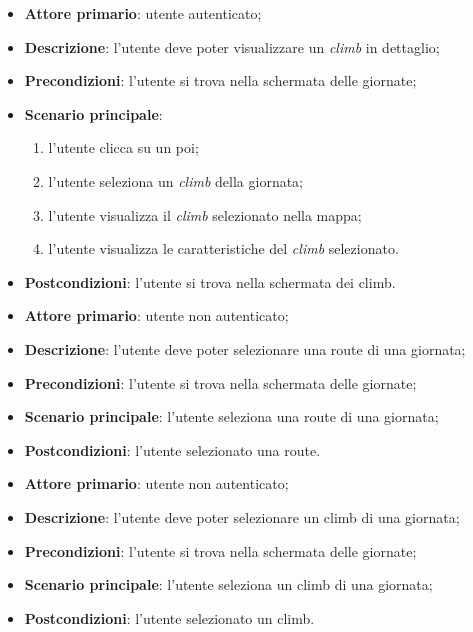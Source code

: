 \label{uc:vis_climb}
\begin{itemize}
	\item \textbf{Attore primario}: utente autenticato;
	\item \textbf{Descrizione}: l'utente deve poter visualizzare un \textit{climb} in dettaglio;
    \item \textbf{Precondizioni}: l'utente si trova nella schermata delle giornate;
	\item \textbf{Scenario principale}:
    \begin{enumerate}
        \item l'utente clicca su un poi;
        \item l'utente seleziona un \textit{climb} della giornata;
        \item l'utente visualizza il \textit{climb} selezionato nella mappa;
        \item l'utente visualizza le caratteristiche del \textit{climb} selezionato.
    \end{enumerate}
	\item \textbf{Postcondizioni}: l'utente si trova nella schermata dei climb.
\end{itemize}

\label{uc:sel_route}
\begin{itemize}
    \item \textbf{Attore primario}: utente non autenticato;
    \item \textbf{Descrizione}: l'utente deve poter selezionare una route di una giornata;
    \item \textbf{Precondizioni}: l'utente si trova nella schermata delle giornate;
    \item \textbf{Scenario principale}: l'utente seleziona una route di una giornata;
    \item \textbf{Postcondizioni}: l'utente selezionato una route.
\end{itemize}

\label{uc:sel_climb}
\begin{itemize}
    \item \textbf{Attore primario}: utente non autenticato;
    \item \textbf{Descrizione}: l'utente deve poter selezionare un climb di una giornata;
    \item \textbf{Precondizioni}: l'utente si trova nella schermata delle giornate;
    \item \textbf{Scenario principale}: l'utente seleziona un climb di una giornata;
    \item \textbf{Postcondizioni}: l'utente selezionato un climb.
\end{itemize}

